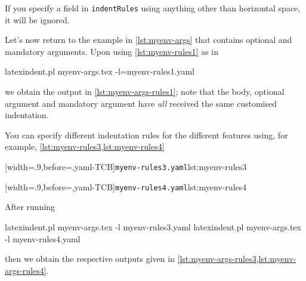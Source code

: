 
If you specify a field in \texttt{indentRules} using anything other than horizontal space, it will be ignored.

Let's now return to the example in \cref{lst:myenv-args} that contains optional and mandatory arguments. Upon using \cref{lst:myenv-rules1} as in
\begin{commandshell}
latexindent.pl myenv-args.tex -l=myenv-rules1.yaml  
\end{commandshell}
we obtain the output in \cref{lst:myenv-args-rules1}; note that the body, optional argument and mandatory argument have \emph{all} 
received the same customised indentation.

You can specify different indentation rules for the different features using, for example, \cref{lst:myenv-rules3,lst:myenv-rules4}

\begin{minipage}{.49\textwidth}
[width=.9\linewidth,before=\centering,yaml-TCB]{\texttt{myenv-rules3.yaml}}{lst:myenv-rules3}
\end{minipage}
\hfill
\begin{minipage}{.49\textwidth}
[width=.9\linewidth,before=\centering,yaml-TCB]{\texttt{myenv-rules4.yaml}}{lst:myenv-rules4}
\end{minipage}

After running
\begin{commandshell}
latexindent.pl myenv-args.tex -l myenv-rules3.yaml  
latexindent.pl myenv-args.tex -l myenv-rules4.yaml  
\end{commandshell}
then we obtain the respective outputs given in \cref{lst:myenv-args-rules3,lst:myenv-args-rules4}.

\begin{minipage}{.45\textwidth}
\end{minipage}
\hfill
\begin{minipage}{.45\textwidth}
\end{minipage}

